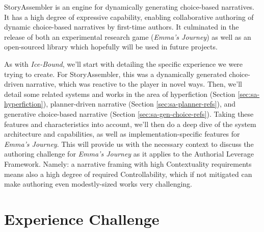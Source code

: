 

StoryAssembler is an engine for dynamically generating choice-based narratives. It has a high degree of expressive capability, enabling collaborative authoring of dynamic choice-based narratives by first-time authors. It culminated in the release of both an experimental research game (\textit{Emma's Journey}) as well as an open-sourced library which hopefully will be used in future projects.

As with \textit{Ice-Bound}, we'll start with detailing the specific experience we were trying to create. For StoryAssembler, this was a dynamically generated choice-driven narrative, which was reactive to the player in novel ways. Then, we'll detail some related systems and works in the area of hyperfiction (Section \ref{sec:sa-hyperfiction}), planner-driven narrative (Section \ref{sec:sa-planner-refs}), and generative choice-based narrative (Section \ref{sec:sa-gen-choice-refs}). Taking these features and characteristics into account, we'll then do a deep dive of the system architecture and capabilities, as well as implementation-specific features for \textit{Emma's Journey}. This will provide us with the necessary context to discuss the authoring challenge for \textit{Emma's Journey} as it applies to the Authorial Leverage Framework. Namely: a narrative framing with high Contextuality requirements means also a high degree of required Controllability, which if not mitigated can make authoring even modestly-sized works very challenging.

\section{Experience Challenge}
\label{experience-challenge}

